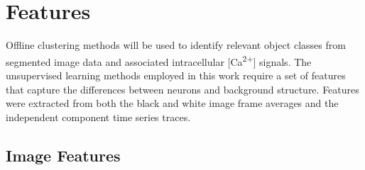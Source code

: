 \documentclass[10pt]{article}
\newcommand{\calcium}[0]{Ca\textsuperscript{2+}}
\begin{document}
\section{Features}

Offline clustering methods will be used to identify relevant object classes from segmented image data and associated intracellular [\calcium] signals.
The unsupervised learning methods employed in this work require a set of features that capture the differences between neurons and background structure. 
Features were extracted from both the black and white image frame averages and the independent component time series traces.

\subsection{Image Features}
\end{document}
